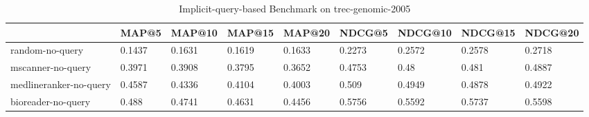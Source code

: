 \begin{table}
\centering
\caption{Implicit-query-based Benchmark on trec-genomic-2005}
\label{tab:noquery-benchmark-trec-genomic-2005}
\begin{tabular}{lllllllll}
\toprule
{} &    MAP@5 &  MAP@10 &  MAP@15 &  MAP@20 &   NDCG@5 & NDCG@10 & NDCG@15 & NDCG@20 \\
\midrule
random-no-query        &   0.1437 &  0.1631 &  0.1619 &  0.1633 &   0.2273 &  0.2572 &  0.2578 &  0.2718 \\
mscanner-no-query      &   0.3971 &  0.3908 &  0.3795 &  0.3652 &   0.4753 &    0.48 &   0.481 &  0.4887 \\
medlineranker-no-query &   0.4587 &  0.4336 &  0.4104 &  0.4003 &    0.509 &  0.4949 &  0.4878 &  0.4922 \\
bioreader-no-query     &    0.488 &  0.4741 &  0.4631 &  0.4456 &   0.5756 &  0.5592 &  0.5737 &  0.5598 \\
\bottomrule
\end{tabular}
\end{table}


